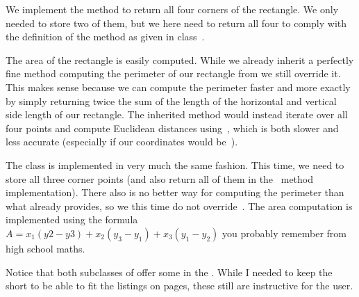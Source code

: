 We implement the method  to return all four corners of the rectangle.
We only needed to store two of them, but we here need to return all four to comply with the definition of the method as given in class~.

The area of the rectangle is easily computed.
While we already inherit a perfectly fine method  computing the perimeter of our rectangle from  we still override it.
This makes sense because we can compute the perimeter faster and more exactly by simply returning twice the sum of the length of the horizontal and vertical side length of our rectangle.
The inherited  method would instead iterate over all four points and compute Euclidean distances using~, which is both slower and less accurate (especially if our coordinates would be~).

The class  is implemented in very much the same fashion.
This time, we need to store all three corner points (and also return all of them in the ~method implementation).
There also is no better way for computing the perimeter than what  already provides, so we this time do not override~.
The area computation is implemented using the formula~$A=x_1(y2-y3)+x_2(y_3-y_1)+x_3(y_1-y_2)$ you probably remember from high school maths.

Notice that both subclasses of  offer some  in the .
While I needed to keep the  short to be able to fit the listings on pages, these  still are instructive for the user.%
%
\endhsection%
